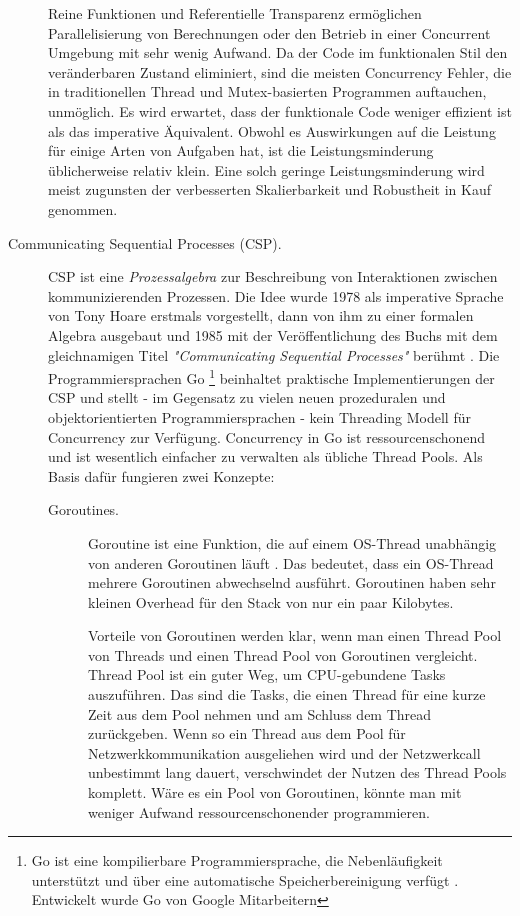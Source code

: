 \begin{description}
	Reine Funktionen und Referentielle Transparenz ermöglichen Parallelisierung von Berechnungen oder den Betrieb in einer Concurrent Umgebung mit sehr wenig Aufwand. Da der Code im funktionalen Stil den veränderbaren Zustand eliminiert, sind die meisten Concurrency Fehler, die in traditionellen Thread und Mutex-basierten Programmen auftauchen, unmöglich. Es wird erwartet, dass der funktionale Code weniger effizient ist als das imperative Äquivalent. Obwohl es Auswirkungen auf die Leistung für einige Arten von Aufgaben hat, ist die Leistungsminderung üblicherweise relativ klein. Eine solch geringe Leistungsminderung wird meist zugunsten der verbesserten Skalierbarkeit und Robustheit in Kauf genommen.
	
	\item[Communicating Sequential Processes (CSP).] CSP ist eine \textit{Prozessalgebra} zur Beschreibung von Interaktionen zwischen kommunizierenden Prozessen. Die Idee wurde 1978 als imperative Sprache von Tony Hoare erstmals vorgestellt, dann von ihm zu einer formalen Algebra ausgebaut und 1985 mit der Veröffentlichung des Buchs mit dem gleichnamigen Titel \textit{"Communicating Sequential Processes"} berühmt \cite{Graham_communicatingsequential}. Die Programmiersprachen Go \footnote{Go ist eine kompilierbare Programmiersprache, die Nebenläufigkeit unterstützt und über eine automatische Speicherbereinigung verfügt \cite{Westrup14usingthe}. Entwickelt wurde Go von Google Mitarbeitern} beinhaltet praktische Implementierungen der CSP und stellt - im Gegensatz zu vielen neuen prozeduralen und objektorientierten Programmiersprachen - kein Threading Modell für Concurrency zur Verfügung. Concurrency in Go ist ressourcenschonend und ist wesentlich einfacher zu verwalten als übliche Thread Pools. Als Basis dafür fungieren zwei Konzepte:
	
	\begin{description} 
		\item[Goroutines.] Goroutine ist eine Funktion, die auf einem OS-Thread unabhängig von anderen Goroutinen läuft \cite{Westrup14usingthe}. Das bedeutet, dass ein OS-Thread mehrere Goroutinen abwechselnd ausführt. Goroutinen haben sehr kleinen Overhead für den Stack von nur ein paar Kilobytes.
		
		Vorteile von Goroutinen werden klar, wenn man einen Thread Pool von Threads und einen Thread Pool von Goroutinen vergleicht. Thread Pool ist ein guter Weg, um CPU-gebundene Tasks auszuführen. Das sind die Tasks, die einen Thread für eine kurze Zeit aus dem Pool nehmen und am Schluss dem Thread zurückgeben. Wenn so ein Thread aus dem Pool für Netzwerkkommunikation ausgeliehen wird und der Netzwerkcall unbestimmt lang dauert, verschwindet der Nutzen des Thread Pools komplett. Wäre es ein Pool von Goroutinen, könnte man mit weniger Aufwand ressourcenschonender programmieren.
		

\end{description}
\end{description}

